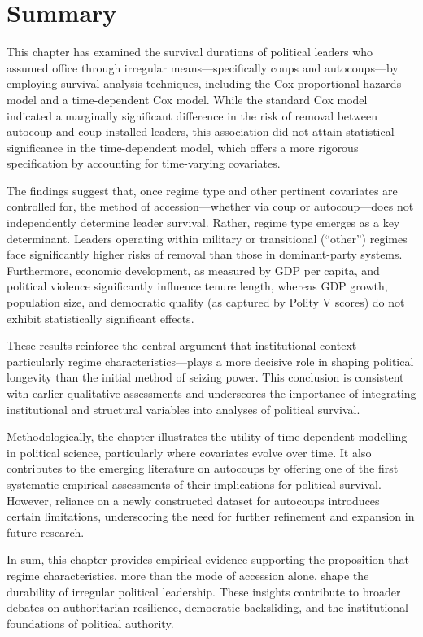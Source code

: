 \documentclass[
  12pt,
]{report}
\begin{document}
\section{Summary}\label{summary-2}

This chapter has examined the survival durations of political leaders
who assumed office through irregular means---specifically coups and
autocoups---by employing survival analysis techniques, including the Cox
proportional hazards model and a time-dependent Cox model. While the
standard Cox model indicated a marginally significant difference in the
risk of removal between autocoup and coup-installed leaders, this
association did not attain statistical significance in the
time-dependent model, which offers a more rigorous specification by
accounting for time-varying covariates.

The findings suggest that, once regime type and other pertinent
covariates are controlled for, the method of accession---whether via
coup or autocoup---does not independently determine leader survival.
Rather, regime type emerges as a key determinant. Leaders operating
within military or transitional (``other'') regimes face significantly
higher risks of removal than those in dominant-party systems.
Furthermore, economic development, as measured by GDP per capita, and
political violence significantly influence tenure length, whereas GDP
growth, population size, and democratic quality (as captured by Polity V
scores) do not exhibit statistically significant effects.

These results reinforce the central argument that institutional
context---particularly regime characteristics---plays a more decisive
role in shaping political longevity than the initial method of seizing
power. This conclusion is consistent with earlier qualitative
assessments and underscores the importance of integrating institutional
and structural variables into analyses of political survival.

Methodologically, the chapter illustrates the utility of time-dependent
modelling in political science, particularly where covariates evolve
over time. It also contributes to the emerging literature on autocoups
by offering one of the first systematic empirical assessments of their
implications for political survival. However, reliance on a newly
constructed dataset for autocoups introduces certain limitations,
underscoring the need for further refinement and expansion in future
research.

In sum, this chapter provides empirical evidence supporting the
proposition that regime characteristics, more than the mode of accession
alone, shape the durability of irregular political leadership. These
insights contribute to broader debates on authoritarian resilience,
democratic backsliding, and the institutional foundations of political
authority.
\end{document}

